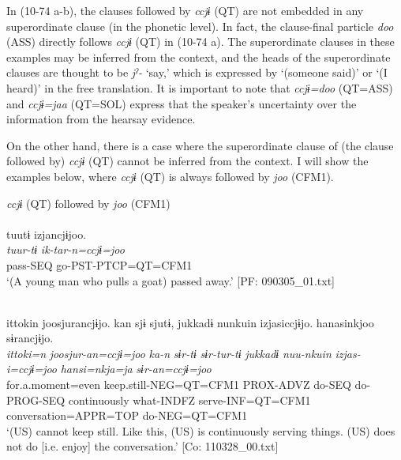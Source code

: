 \begin{xlist}
In (10-74 a-b), the clauses followed by \textit{ccjɨ} (QT) are not embedded in any superordinate clause (in the phonetic level). In fact, the clause-final particle \textit{doo} (ASS) directly follows \textit{ccjɨ} (QT) in (10-74 a). The superordinate clauses in these examples may be inferred from the context, and the heads of the superordinate clauses are thought to be \textit{jˀ-} ‘say,’ which is expressed by ‘(someone said)’ or ‘(I heard)’ in the free translation. It is important to note that \textit{ccjɨ=doo} (QT=ASS) and \textit{ccjɨ=jaa} (QT=SOL) express that the speaker’s uncertainty over the information from the hearsay evidence.

  On the other hand, there is a case where the superordinate clause of (the clause followed by) \textit{ccjɨ} (QT) cannot be inferred from the context. I will show the examples below, where \textit{ccjɨ} (QT) is always followed by \textit{joo} (CFM1).

\ea\label{ex:10.75}   \textit{ccjɨ} (QT) followed by \textit{joo} (CFM1)\\
  \ea{}\\
      \glll    tuutɨ  izjancjɨjoo.\\
      \textit{tuur-tɨ}  \textit{ik-tar-n=ccjɨ=joo}\\
      pass-SEQ  go-PST-PTCP=QT=CFM1\\
      \glt       ‘(A young man who pulls a goat) passed away.’ [PF: 090305\_01.txt]

  \ex{}\\
      \glll    {\textbar}ittoki{\textbar}n  joosjurancjɨjo.  kan  sjɨ   sjutɨ,  jukkadɨ  nunkuin  izjasiccjɨjo. hanasinkjoo  sɨrancjɨjo.\\
      \textit{ittoki=n}  \textit{joosjur-an=ccjɨ=joo}  \textit{ka-n}  \textit{sɨr-tɨ}  \textit{sɨr-tur-tɨ}  \textit{jukkadɨ}  \textit{nuu-nkuin}  \textit{izjas-i=ccjɨ=joo} \textit{hansi=nkja=ja}  \textit{sɨr-an=ccjɨ=joo}\\
      for.a.moment=even  keep.still-NEG=QT=CFM1  PROX-ADVZ  do-SEQ  do-PROG-SEQ  continuously  what-INDFZ  serve-INF=QT=CFM1   conversation=APPR=TOP  do-NEG=QT=CFM1\\      
      \glt ‘(US) cannot keep still. Like this, (US) is continuously serving things. (US) does not do [i.e. enjoy] the conversation.’   [Co: 110328\_00.txt]
    \z
\z


\end{xlist}
